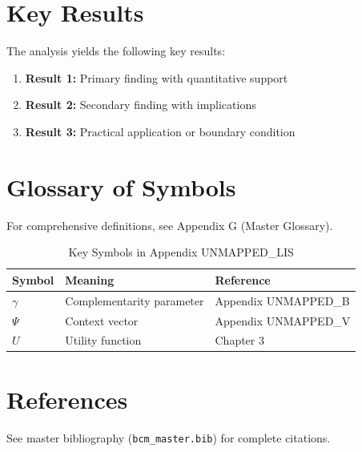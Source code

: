 \section{Key Results}
\label{sec:lis-results}

The analysis yields the following key results:

\begin{enumerate}
    \item \textbf{Result 1:} Primary finding with quantitative support
    \item \textbf{Result 2:} Secondary finding with implications
    \item \textbf{Result 3:} Practical application or boundary condition
\end{enumerate}

\section{Glossary of Symbols}
\label{sec:lis-glossary}

For comprehensive definitions, see Appendix G (Master Glossary).

\begin{table}[htbp]
\centering
\caption{Key Symbols in Appendix UNMAPPED_LIS}
\begin{tabular}{lll}
\toprule
\textbf{Symbol} & \textbf{Meaning} & \textbf{Reference} \\
\midrule
$\gamma$ & Complementarity parameter & Appendix UNMAPPED_B \\
$\Psi$ & Context vector & Appendix UNMAPPED_V \\
$U$ & Utility function & Chapter 3 \\
\bottomrule
\end{tabular}
\end{table}


\section{References}
\label{sec:lis-references}

See master bibliography (\texttt{bcm\_master.bib}) for complete citations.

\nocite{bcm_master}

